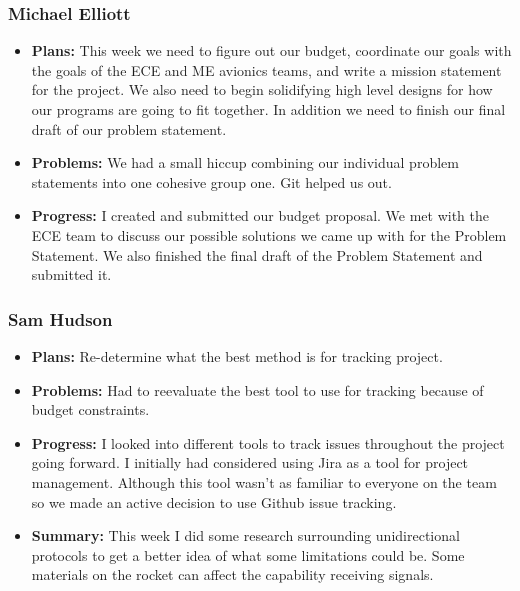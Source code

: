 \documentclass[onecolumn, draftclsnofoot,10pt, compsoc]{IEEEtran}
\begin{document}
\subsubsection{Michael Elliott}
\begin {itemize}
\item \textbf{Plans: }
  This week we need to figure out our budget, coordinate our goals with the goals of the ECE and ME avionics teams, and write a mission statement for the project. We also need to begin solidifying high level designs for how our programs are going to fit together. In addition we need to finish our final draft of our problem statement.
\item \textbf{Problems: }
  We had a small hiccup combining our individual problem statements into one cohesive group one. Git helped us out.
\item \textbf{Progress: }
  I created and submitted our budget proposal. We met with the ECE team to discuss our possible solutions we came up with for the Problem Statement. We also finished the final draft of the Problem Statement and submitted it.
\end {itemize}
\subsubsection{Sam Hudson}
\begin {itemize}
\item \textbf{Plans: }Re-determine what the best method is for tracking project.
\item \textbf{Problems: }Had to reevaluate the best tool to use for tracking because of budget constraints.
\item \textbf{Progress: }I looked into different tools to track issues throughout the project going forward. I initially had considered using Jira as a tool for project management. Although this tool wasn't as familiar to everyone on the team so we made an active decision to use Github issue tracking. 
\item \textbf{Summary: }This week I did some research surrounding unidirectional protocols to get a better idea of what some limitations could be. Some materials on the rocket can affect the capability receiving signals. 
\end {itemize}
\end{document}
